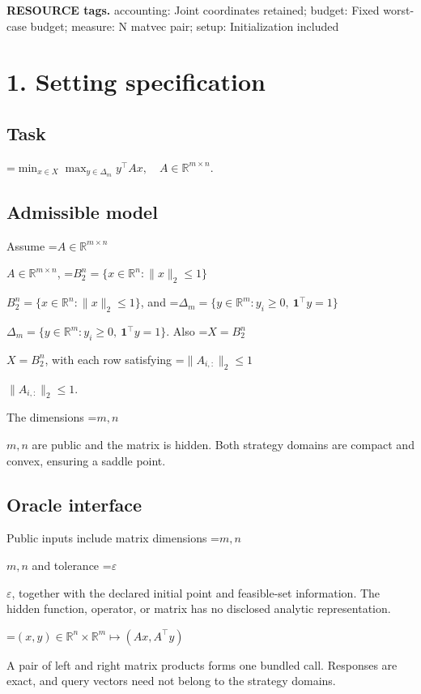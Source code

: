 \documentclass[10pt,a4paper]{article}
\newcommand{\AtlasMath}[1]{\par\begingroup\centering\setbox0=\hbox{$\displaystyle #1$}\ifdim\wd0>1.4\linewidth\typeout{ATLAS WIDE FORMULA: \the\wd0}\fi\ifdim\wd0>\linewidth\resizebox{\linewidth}{!}{\box0}\else\box0\fi\par\endgroup}
\newcommand{\AtlasInlineMath}[1]{\begingroup\setbox0=\hbox{$#1$}\ifdim\wd0>.4\linewidth\endgroup\AtlasMath{#1}\else\endgroup$#1$\fi}
\begin{document}
\textbf{RESOURCE tags.} accounting: Joint coordinates retained; budget: Fixed worst-case budget; measure: N matvec pair; setup: Initialization included



\section{1. Setting specification}


\subsection{Task}



\AtlasMath{\min_{x\in X}\max_{y\in\Delta_m}y^\top Ax,\quad A\in\mathbb{R}^{m\times n}.}




\subsection{Admissible model}


Assume \AtlasInlineMath{A\in\mathbb R^{m\times n}}, \AtlasInlineMath{B_2^n=\{x\in\mathbb R^n:\|x\|_2\le1\}}, and \AtlasInlineMath{\Delta_m=\{y\in\mathbb R^m:y_i\ge0,\ \mathbf1^\top y=1\}}. Also \AtlasInlineMath{X=B_2^n}, with each row satisfying \AtlasInlineMath{\|A_{i,:}\|_2\le1}.



The dimensions \AtlasInlineMath{m,n} are public and the matrix is hidden. Both strategy domains are compact and convex, ensuring a saddle point.



\subsection{Oracle interface}


Public inputs include matrix dimensions \AtlasInlineMath{m,n} and tolerance \AtlasInlineMath{\varepsilon}, together with the declared initial point and feasible-set information. The hidden function, operator, or matrix has no disclosed analytic representation.




\AtlasMath{(x,y)\in\mathbb{R}^n\times\mathbb{R}^m\longmapsto(Ax,A^\top y)}




A pair of left and right matrix products forms one bundled call. Responses are exact, and query vectors need not belong to the strategy domains.
\end{document}
